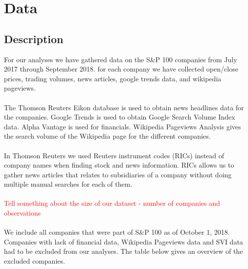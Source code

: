 
\chapter{Data}


\section{Description}
For our analyses we have gathered data on the  S\&P 100 companies from July 2017 through September 2018. for each company we have collected open/close prices, trading volumes, news articles, google trends data, and wikipedia pageviews.  
\\\\
The Thomson Reuters Eikon database is used to obtain news headlines data for the companies. Google Trends is used to obtain Google Search Volume Index data. Alpha Vantage is used for financials. Wikipedia Pageviews Analysis gives the search volume of the Wikipedia page for the different companies. 
\\\\
In Thomson Reuters we used Reuters instrument codes (RICs) instead of company names when finding stock and news information. RICs allows us to  gather news articles that relates to subsidiaries of a company without doing multiple manual searches for each of them.
\\\\
\textcolor{red}{Tell something about the size of our dataset - number of companies and observations}
\\\\
We include all companies that were part of S\&P 100 as of October 1, 2018. Companies with lack of financial data, Wikipedia Pageviews data and SVI data had to be excluded from our analyses. The table below gives an overview of the excluded companies. 

